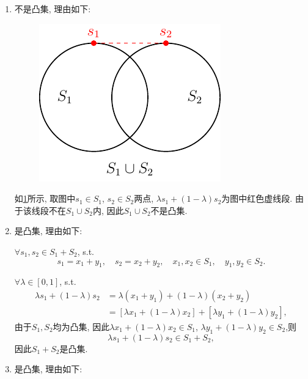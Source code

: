\begin{enumerate}[label=\alph*)]
    \item
        不是凸集, 理由如下:

        \begin{figure}[ht]
            \centering

            \includegraphics{figures/1a.pdf}
            \caption{}
            \label{figure:1a}
        \end{figure}

        如\cref{figure:1a}所示, 取图中$s_1\in S_1$, $s_2\in S_2$两点, $\lambda s_1+(1-\lambda)s_2$为图中红色虚线段.
        由于该线段不在$S_1\cup S_2$内, 因此$S_1\cup S_2$不是凸集.

    \item
        是凸集, 理由如下:

        $\forall s_1,s_2\in S_1+S_2$, s.t.
        \begin{equation*}
            s_1=x_1+y_1,\quad
            s_2=x_2+y_2,\quad
            x_1,x_2\in S_1,\quad
            y_1,y_2\in S_2.
        \end{equation*}

        $\forall\lambda\in[0,1]$, s.t.
        \begin{align*}
            \lambda s_1+(1-\lambda)s_2
            &=\lambda(x_1+y_1)+(1-\lambda)(x_2+y_2) \\
            &=[\lambda x_1+(1-\lambda)x_2]+[\lambda y_1+(1-\lambda)y_2],
        \end{align*}
        由于$S_1,S_2$均为凸集, 因此$\lambda x_1+(1-\lambda)x_2\in S_1$, $\lambda y_1+(1-\lambda)y_2\in S_2$,则
        \begin{equation*}
            \lambda s_1+(1-\lambda)s_2 \in S_1+S_2,
        \end{equation*}
        因此$S_1+S_2$是凸集.

    \item
        是凸集, 理由如下:


\end{enumerate}
